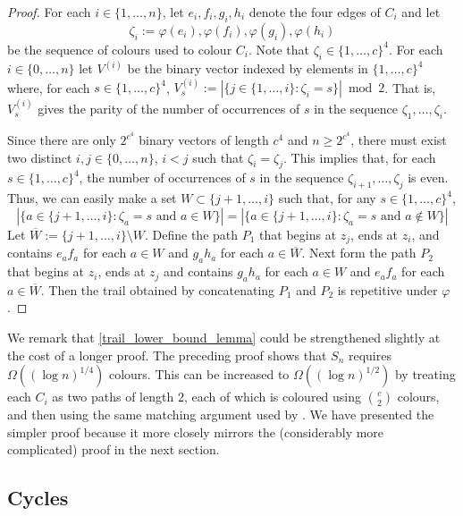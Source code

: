 \documentclass[kpfonts]{patmorin}
\begin{document}
\begin{proof}
    For each $i\in\{1,\ldots,n\}$, let $e_i,f_i,g_i,h_i$ denote the four edges of $C_i$ and let
    \[
        \zeta_i:=\varphi(e_i),\varphi(f_i),\varphi(g_i),\varphi(h_i)
    \]
     be the sequence of colours used to colour $C_i$.  Note that $\zeta_i\in\{1,\ldots,c\}^4$.  For each $i\in\{0,\ldots,n\}$ let $V^{(i)}$ be the binary vector indexed by elements in $\{1,\ldots,c\}^4$ where, for each $s\in\{1,\ldots,c\}^4$, $V^{(i)}_s:=|\{j\in\{1,\ldots,i\}:\zeta_i=s\}|\bmod 2$.  That is, $V^{(i)}_s$ gives the parity of the number of occurrences of $s$ in the sequence $\zeta_1,\ldots,\zeta_i$.

     Since there are only $2^{c^4}$ binary vectors of length $c^4$ and $n\ge 2^{c^4}$, there must exist two distinct $i,j\in\{0,\ldots,n\}$, $i<j$ such that $\zeta_i=\zeta_j$.  This implies that, for each $s\in\{1,\ldots,c\}^4$, the number of occurrences of $s$ in the sequence $\zeta_{i+1},\ldots,\zeta_j$ is even.  Thus, we can easily make a set $W\subset\{j+1,\ldots,i\}$ such that, for any $s\in\{1,\ldots,c\}^4$,
     \[
        |\{a\in\{j+1,\ldots,i\}: \mbox{$\zeta_a=s$ and $a\in W$}\}| =
        |\{a\in\{j+1,\ldots,i\}: \mbox{$\zeta_a=s$ and $a\not\in W$}\}|
     \]
     Let $\overline{W}:=\{j+1,\ldots,i\}\setminus W$.
     Define the path $P_1$ that begins at $z_j$, ends at $z_i$, and contains $e_af_a$ for each $a\in W$ and $g_ah_a$ for each $a\in\overline{W}$.  Next form the path $P_2$ that begins at $z_i$, ends at $z_j$ and contains $g_ah_a$ for each $a\in W$ and $e_af_a$ for each $a\in\overline{W}$.  Then the trail obtained by concatenating $P_1$ and $P_2$ is repetitive under $\varphi$.
\end{proof}

We remark that \cref{trail_lower_bound_lemma} could be strengthened slightly at the cost of a longer proof.  The preceding proof shows that $S_n$ requires $\Omega((\log n)^{1/4})$ colours.  This can be increased to $\Omega((\log n)^{1/2})$ by treating each $C_i$ as two paths of length $2$, each of which is coloured using $\binom{c}{2}$ colours, and then using the same matching argument used by \citet{carmi.dujmovic.ea:anagram-free}. We have presented the simpler proof because it more closely mirrors the (considerably more complicated) proof in the next section.

\subsection{Cycles}
\end{document}
